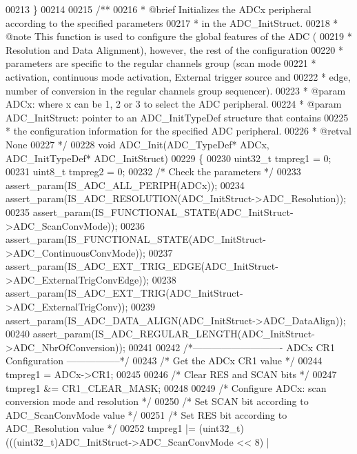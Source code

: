 \begin{DoxyCode}
00213 \}
00214 
00215 \textcolor{comment}{/**}
00216 \textcolor{comment}{  * @brief  Initializes the ADCx peripheral according to the specified parameters }
00217 \textcolor{comment}{  *         in the ADC\_InitStruct.}
00218 \textcolor{comment}{  * @note   This function is used to configure the global features of the ADC ( }
00219 \textcolor{comment}{  *         Resolution and Data Alignment), however, the rest of the configuration}
00220 \textcolor{comment}{  *         parameters are specific to the regular channels group (scan mode }
00221 \textcolor{comment}{  *         activation, continuous mode activation, External trigger source and }
00222 \textcolor{comment}{  *         edge, number of conversion in the regular channels group sequencer).  }
00223 \textcolor{comment}{  * @param  ADCx: where x can be 1, 2 or 3 to select the ADC peripheral.}
00224 \textcolor{comment}{  * @param  ADC\_InitStruct: pointer to an ADC\_InitTypeDef structure that contains}
00225 \textcolor{comment}{  *         the configuration information for the specified ADC peripheral.}
00226 \textcolor{comment}{  * @retval None}
00227 \textcolor{comment}{  */}
00228 \textcolor{keywordtype}{void} ADC_Init(ADC\_TypeDef* ADCx, ADC\_InitTypeDef* ADC\_InitStruct)
00229 \{
00230   uint32\_t tmpreg1 = 0;
00231   uint8\_t tmpreg2 = 0;
00232   \textcolor{comment}{/* Check the parameters */}
00233   assert_param(IS\_ADC\_ALL\_PERIPH(ADCx));
00234   assert_param(IS\_ADC\_RESOLUTION(ADC\_InitStruct->ADC\_Resolution));
00235   assert_param(IS\_FUNCTIONAL\_STATE(ADC\_InitStruct->ADC\_ScanConvMode));
00236   assert_param(IS\_FUNCTIONAL\_STATE(ADC\_InitStruct->ADC\_ContinuousConvMode));
00237   assert_param(IS\_ADC\_EXT\_TRIG\_EDGE(ADC\_InitStruct->ADC\_ExternalTrigConvEdge));
00238   assert_param(IS\_ADC\_EXT\_TRIG(ADC\_InitStruct->ADC\_ExternalTrigConv));
00239   assert_param(IS\_ADC\_DATA\_ALIGN(ADC\_InitStruct->ADC\_DataAlign));
00240   assert_param(IS\_ADC\_REGULAR\_LENGTH(ADC\_InitStruct->ADC\_NbrOfConversion));
00241 
00242   \textcolor{comment}{/*---------------------------- ADCx CR1 Configuration -----------------*/}
00243   \textcolor{comment}{/* Get the ADCx CR1 value */}
00244   tmpreg1 = ADCx->CR1;
00245 
00246   \textcolor{comment}{/* Clear RES and SCAN bits */}
00247   tmpreg1 &= CR1_CLEAR_MASK;
00248 
00249   \textcolor{comment}{/* Configure ADCx: scan conversion mode and resolution */}
00250   \textcolor{comment}{/* Set SCAN bit according to ADC\_ScanConvMode value */}
00251   \textcolor{comment}{/* Set RES bit according to ADC\_Resolution value */}
00252   tmpreg1 |= (uint32\_t)(((uint32\_t)ADC\_InitStruct->ADC_ScanConvMode << 8) |

\end{DoxyCode}
